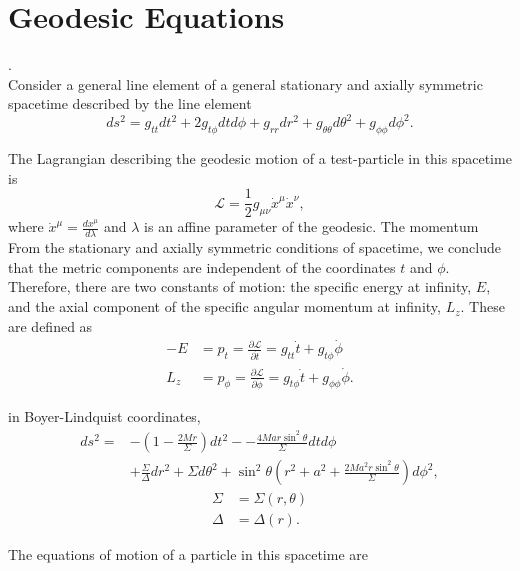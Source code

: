
\chapter{Geodesic Equations}.\\
Consider a general line element of  a general stationary and axially symmetric spacetime described by the line element
\begin{equation}
ds^2 = g_{tt} dt^2 + 2g_{t \phi} dt d\phi + g_{rr} dr^2 + g_{\theta \theta} d\theta^2 + g_{\phi \phi} d\phi^2.
\end{equation}

The Lagrangian describing the geodesic motion of a test-particle in this spacetime is
\begin{equation}
\mathcal{L} = \frac{1}{2} g_{\mu \nu} \dot{x}^\mu \dot{x}^\nu, 
\end{equation}
where $\dot{x}^\mu = \frac{dx^\mu}{d\lambda}$ and $\lambda$ is an affine parameter of the geodesic. 
The momentum
From the stationary and axially symmetric conditions of spacetime, we conclude that the metric components are independent of the coordinates $t$ and $\phi$. Therefore, there are two constants of motion: the specific energy at infinity, $E$, and the axial component of the specific angular momentum at infinity, $L_z$. These are defined as
\begin{align}
-E &= p_t = \frac{\partial \mathcal{L}}{\partial \dot{t}} = g_{tt} \dot{t} + g_{t \phi} \dot{\phi} \\
L_z &= p_\phi = \frac{\partial \mathcal{L}}{\partial \dot{\phi}} = g_{t\phi} \dot{t} + g_{\phi \phi} \dot{\phi}.
\end{align}












in Boyer-Lindquist coordinates,
\begin{align}
	ds^2 = &-\left( 1- \frac{2Mr}{\Sigma} \right) dt^2 - -\frac{4Mar\sin^2 \theta}{\Sigma} dt d\phi\\
	&+ \frac{\Sigma}{\Delta} dr^2 +\Sigma d\theta^2 + \sin^2 \theta \left( r^2 + a^2 +\frac{2Ma^2 r \sin^2 \theta}{\Sigma} \right) d\phi^2,
\end{align}
\begin{align}
	\Sigma &= \Sigma(r,\theta)\\
	\Delta &= \Delta(r).
\end{align}

The equations of motion of a particle in this spacetime are 

